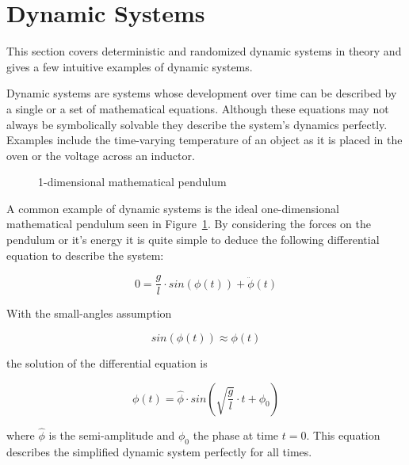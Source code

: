 \section{Dynamic Systems}

\label{sec:dynamicsystems}

This section covers deterministic and randomized dynamic systems in theory and gives a few intuitive examples of dynamic systems.

Dynamic systems are systems whose development over time can be described by a single or a set of mathematical equations. Although these equations may not always be symbolically solvable they describe the system's dynamics perfectly. Examples include the time-varying temperature of an object as it is placed in the oven or the voltage across an inductor.

\begin{figure}
\begin{center}
\end{center}
\caption{1-dimensional mathematical pendulum}
\label{1dpendulum}
\end{figure}

A common example of dynamic systems is the ideal one-dimensional mathematical pendulum seen in Figure~\ref{1dpendulum}. By considering the forces on the pendulum or it's energy it is quite simple to deduce the following differential equation to describe the system:

\[
0 = \frac{g}{l}\cdot sin(\phi(t))+\ddot{\phi}(t)
\]

With the small-angles assumption

\[
sin(\phi(t))\approx\phi(t)
\]

the solution of the differential equation is

\[
\phi(t) = \hat{\phi} \cdot sin( \sqrt{\frac{g}{l}} \cdot t + {\phi}_0)
\]

where $\hat{\phi}$ is the semi-amplitude and ${\phi}_0$ the phase at time $t=0$. This equation describes the simplified dynamic system perfectly for all times.

